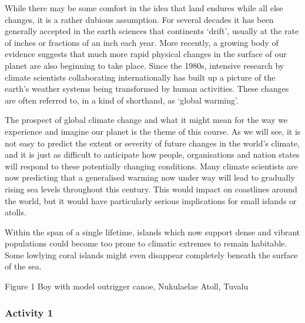 \documentclass[letterpaper,10pt,english]{sphinxmanual}
\let\sphinxpxdimen\pdfpxdimen\else\newdimen\sphinxpxdimen
\begin{document}
While there may be some comfort in the idea that land endures while all else changes, it is a rather dubious assumption. For several decades it has been generally accepted in the earth sciences that continents ‘drift’, usually at the rate of inches or fractions of an inch each year. More recently, a growing body of evidence suggests that much more rapid physical changes in the surface of our planet are also beginning to take place. Since the 1980s, intensive research by climate scientists
collaborating internationally has built up a picture of the earth’s weather systems being transformed by human activities. These changes are often referred to, in a kind of shorthand, as ‘global warming’.

The prospect of global climate change and what it might mean for the way we experience and imagine our planet is the theme of this course. As we will see, it is not easy to predict the extent or severity of future changes in the world’s climate, and it is just as difficult to anticipate how people, organisations and nation states will respond to these potentially changing conditions. Many climate scientists are now predicting that a generalised warming now under way will lead to gradually rising
sea levels throughout this century. This would impact on coastlines around the world, but it would have particularly serious implications for small islands or atolls.

Within the span of a single lifetime, islands which now support dense and vibrant populations could become too prone to climatic extremes to remain habitable. Some low\sphinxhyphen{}lying coral islands might even disappear completely beneath the surface of the sea.

\sphinxincludegraphics[width=443\sphinxpxdimen,height=227\sphinxpxdimen]{{dd205_3_001i}.jpg}

Figure 1 Boy with model outrigger canoe, Nukulaelae Atoll, Tuvalu


\subsubsection{Activity 1}
\label{\detokenize{content/session_00/Part_00_01:Activity-1}}
\end{document}
